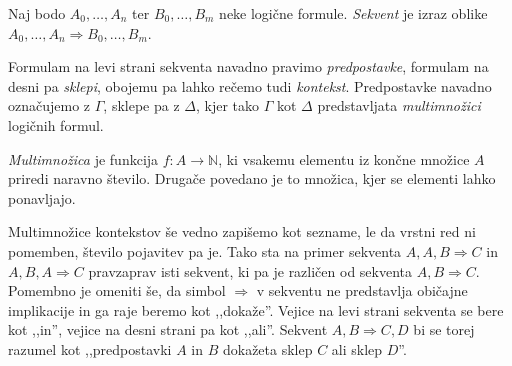 \begin{definicija}
    Naj bodo $A_0,\ldots,A_n$ ter $B_0,\ldots,B_m$ neke logične formule. \emph{Sekvent} je izraz oblike $A_0,\ldots,A_n \Rightarrow B_0,\ldots,B_m$.
\end{definicija}

Formulam na levi strani sekventa navadno pravimo \emph{predpostavke}, formulam na desni pa \emph{sklepi}, obojemu pa lahko rečemo tudi \emph{kontekst}. Predpostavke navadno označujemo z $\Gamma$, sklepe pa z $\Delta$, kjer tako $\Gamma$ kot $\Delta$ predstavljata \emph{multimnožici} logičnih formul.

\begin{definicija}
    \emph{Multimnožica} je funkcija $f:A\to\mathbb{N}$, ki vsakemu elementu iz končne množice $A$ priredi naravno število. Drugače povedano je to množica, kjer se elementi lahko ponavljajo.
\end{definicija}

Multimnožice kontekstov še vedno zapišemo kot sezname, le da vrstni red ni pomemben, število pojavitev pa je. Tako sta na primer sekventa $A,A,B \Rightarrow C$ in $A,B,A\Rightarrow C$ pravzaprav isti sekvent, ki pa je različen od sekventa $A,B \Rightarrow C$.
Pomembno je omeniti še, da simbol $\Rightarrow$ v sekventu ne predstavlja običajne implikacije in ga raje beremo kot ,,dokaže''. Vejice na levi strani sekventa se bere kot ,,in'', vejice na desni strani pa kot ,,ali''. Sekvent $A,B \Rightarrow C,D$ bi se torej razumel kot ,,predpostavki $A$ in $B$ dokažeta sklep $C$ ali sklep $D$''.
